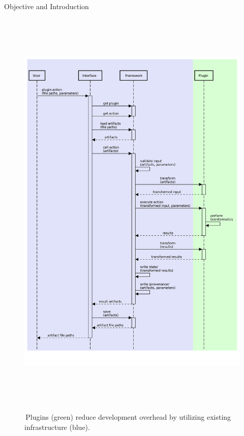 \documentclass[final]{beamer}
\newlength{\colwidth}
\begin{document}
\begin{frame}[t]
\begin{columns}[t]
\begin{column}{\colwidth}
\begin{block}{Objective and Introduction}
    \begin{figure}[tph!]
    {\includegraphics[height=20cm]{assets/action_call_sequence_diagram}}
    \caption{\,Plugins (green) reduce development overhead by utilizing existing infrastructure (blue).}
    \label{fig:callSequence}
    \end{figure}


\end{block}
\end{column}
\end{columns}
\end{frame}
\end{document}
